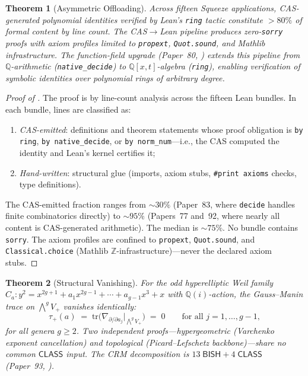 \documentclass[11pt]{article}
\theoremstyle{plain}
\newtheorem{theorem}{Theorem}[section]
\theoremstyle{definition}
\theoremstyle{remark}
\newcommand{\ZZ}{\mathbb{Z}}
\newcommand{\QQ}{\mathbb{Q}}
\newcommand{\tr}{\mathrm{tr}}
\newcommand{\BISH}{\mathsf{BISH}}
\newcommand{\CLASS}{\mathsf{CLASS}}
\begin{document}
\begin{theorem}[Asymmetric Offloading]\label{thm:D}
Across fifteen Squeeze applications, CAS-generated polynomial
identities verified by Lean's \texttt{ring} tactic constitute
$>80\%$ of formal content by line count.  The CAS$\to$Lean
pipeline produces zero-\texttt{sorry} proofs with axiom profiles
limited to \texttt{propext}, \texttt{Quot.sound}, and Mathlib
infrastructure.  The function-field upgrade (Paper~80, \cite{p80})
extends this pipeline from $\QQ$-arithmetic
(\texttt{native\_decide}) to $\QQ[x,t]$-algebra (\texttt{ring}),
enabling verification of symbolic identities over polynomial rings
of arbitrary degree.
\end{theorem}

\begin{proof}[Proof of ]
The proof is by line-count analysis across the fifteen Lean bundles.  In each bundle, lines are classified as:
\begin{enumerate}[label=(\roman*),nosep]
\item \emph{CAS-emitted}: definitions and theorem statements whose proof obligation is \texttt{by ring}, \texttt{by native\_decide}, or \texttt{by norm\_num}---i.e., the CAS computed the identity and Lean's kernel certifies it;
\item \emph{Hand-written}: structural glue (imports, axiom stubs, \texttt{\#print axioms} checks, type definitions).
\end{enumerate}
The CAS-emitted fraction ranges from ${\sim}30\%$ (Paper~83, where \texttt{decide} handles finite combinatorics directly) to ${\sim}95\%$ (Papers~77 and~92, where nearly all content is CAS-generated arithmetic).  The median is ${\sim}75\%$.  No bundle contains \texttt{sorry}.  The axiom profiles are confined to \texttt{propext}, \texttt{Quot.sound}, and \texttt{Classical.choice} (Mathlib $\ZZ$-infrastructure)---never the declared axiom stubs.
\end{proof}

\begin{theorem}[Structural Vanishing]\label{thm:E}
For the odd hyperelliptic Weil family $C_a: y^2 = x^{2g+1} + a_1 x^{2g-1} + \cdots + a_{g-1} x^3 + x$ with $\QQ(i)$-action, the Gauss--Manin trace on $\bigwedge^g V_+$ vanishes identically:
\[
  \tau_+(a) \;=\; \tr\!\bigl(\nabla_{\partial/\partial a_j}\big|_{\bigwedge^g V_+}\bigr) \;=\; 0
  \qquad \text{for all } j = 1, \ldots, g-1,
\]
for all genera $g \geq 2$.  Two independent proofs---hypergeometric
(Varchenko exponent cancellation) and topological (Picard--Lefschetz
backbone)---share no common $\CLASS$ input.  The CRM decomposition
is $13\;\BISH + 4\;\CLASS$ (Paper~93, \cite{p93}).
\end{theorem}
\end{document}
